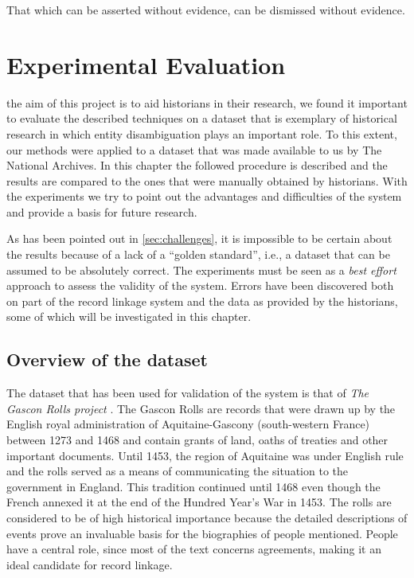 \begin{savequote}[75mm] 
That which can be asserted without evidence, can be dismissed without evidence.
\end{savequote}




\chapter{Experimental Evaluation}
\label{ch:experiments}

 the aim of this project is to aid historians in their research, we found it important to evaluate the described techniques on a dataset that is exemplary of historical research in which entity disambiguation plays an important role.
To this extent, our methods were applied to a dataset that was made available to us by The National Archives.
In this chapter the followed procedure is described and the results are compared to the ones that were manually obtained by historians.
With the experiments we try to point out the advantages and difficulties of the system and provide a basis for future research.

As has been pointed out in \cref{sec:challenges}, it is impossible to be certain about the results because of a lack of a ``golden standard'', i.e., a dataset that can be assumed to be absolutely correct.
The experiments must be seen as a \emph{best effort} approach to assess the validity of the system.
Errors have been discovered both on part of the record linkage system and the data as provided by the historians, some of which will be investigated in this chapter.




\section{Overview of the dataset}
\label{sec:dataset}

The dataset that has been used for validation of the system is that of \emph{The Gascon Rolls project} \citep{GasconRolls}.
The Gascon Rolls are records that were drawn up by the English royal administration of Aquitaine-Gascony (south-western France) between 1273 and 1468 and contain grants of land, oaths of treaties and other important documents.
Until 1453, the region of Aquitaine was under English rule and the rolls served as a means of communicating the situation to the government in England.
This tradition continued until 1468 even though the French annexed it at the end of the Hundred Year's War in 1453.
The rolls are considered to be of high historical importance because the detailed
descriptions of events prove an invaluable basis for the biographies of people mentioned.
People have a central role, since most of the text concerns agreements, making it an ideal candidate for record linkage.

